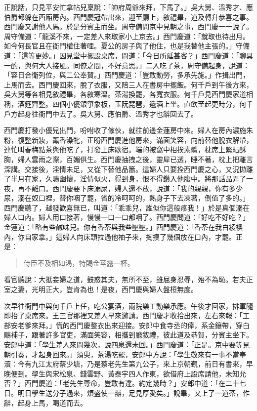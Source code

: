 正說話，只見平安忙拿帖兒稟說：「帥府周爺來拜，下馬了。」吳大舅、溫秀才、應伯爵都躲在西廂房內。西門慶冠帶出來，迎至廳上，敘禮畢，道及轉升恭喜之事。西門慶又謝他人馬。於是分賓主而坐。周守備問京中見朝之事，西門慶一一說了。周守備道：「龍溪不來，一定差人來取家小上京去。」西門慶道：「就取也待出月。如今何長官且在衙門權住著哩。夏公的房子與了他住，也是我替他主張的。」守備道：「這等更妙。」因見堂中擺設桌席，問道：「今日所延甚客？」西門慶道：「聊具一酌，與何大人接風。同僚之間，不好意思。」二人吃了茶，周守備起身，說道：「容日合衛列位，與二公奉賀。」西門慶道：「豈敢動勞，多承先施。」作揖出門，上馬而去。西門慶回來，脫了衣服，又陪三人在書房中擺飯。何千戶到午後方來，吳大舅等各相見敘禮畢，各敘寒溫。茶湯換罷，各寬衣服。何千戶見西門慶家道相稱，酒筵齊整。四個小優銀箏象板，玉阮琵琶，遞酒上坐。直飲至起更時分，何千戶方起身往衙門中去了。吳大舅、應伯爵、溫秀才也辭回去了。

西門慶打發小優兒出門，吩咐收了傢伙，就往前邊金蓮房中來。婦人在房內濃施朱粉，復整新妝，薰香澡牝，正盼西門慶進他房來，滿面笑容，向前替他脫衣解帶，連忙叫春梅點茶與他吃了，打發上床歇宿。端的被窩中相挨素體，枕席上緊貼酥胸，婦人雲雨之際，百媚俱生。西門慶抽拽之後，靈犀已透，睡不著，枕上把離言深講。交接後，淫情未足，又從下替他品簫。這婦人只要拴西門慶之心，又況拋離了半月在家，久曠幽懷，淫情似火，得到身，恨不得鑽入他腹中。將那話品弄了一夜，再不離口。西門慶要下床溺尿，婦人還不放，說道：「我的親親，你有多少尿，溺在奴口裡，替你咽了罷，省的冷呵呵的，熱身子下去凍著，倒值了多的。」西門慶聽了，越發歡喜無已，叫道：「乖乖兒，誰似你這般疼我！」於是真個溺在婦人口內。婦人用口接著，慢慢一口一口都咽了。西門慶問道：「好吃不好吃？」金蓮道：「略有些鹹味兒。你有香茶與我些壓壓。」西門慶道：「香茶在我白綾襖內，你自家拿。」這婦人向床頭拉過他袖子來，掏摸了幾個放在口內，才罷。正是：
\begin{quote}
侍臣不及相如渴，特賜金莖露一杯。
\end{quote}

看官聽說：大抵妾婦之道，鼓惑其夫，無所不至，雖屈身忍辱，殆不為恥。若夫正室之妻，光明正大，豈肯為也！是夜，西門慶與婦人盤桓無度。

次早往衙門中與何千戶上任，吃公宴酒，兩院樂工動樂承應。午後才回家，排軍隨即抬了桌席來。王三官那裡又差人早來邀請。西門慶才收拾出來，左右來報：「工部安老爹來拜。」慌的西門慶整衣出來迎接。安郎中食寺丞的俸，系金鑲帶，穿白鷳補子，跟著許多官吏，滿面笑容，相攜到廳敘禮，彼此道及恭賀，分賓主坐下。安郎中道：「學生差人來問幾次，說四泉還未回。」西門慶道：「正是。京中要等見朝引奏，才起身回來。」須臾，茶湯吃罷，安郎中方說：「學生敬來有一事不當奉瀆：今有九江太府蔡少塘，乃是蔡老先生第九公子，來上京朝覲，前日有書來，早晚便到。學生與宋松泉、錢雲野、黃泰宇四人作東，欲借府上設席請他，未知允否？」西門慶道：「老先生尊命，豈敢有違。約定幾時？」安郎中道：「在二十七日。明日學生送分子過來，煩盛使一辦，足見厚愛矣。」說畢，又上了一道茶，作辭，起身上馬，喝道而去。

